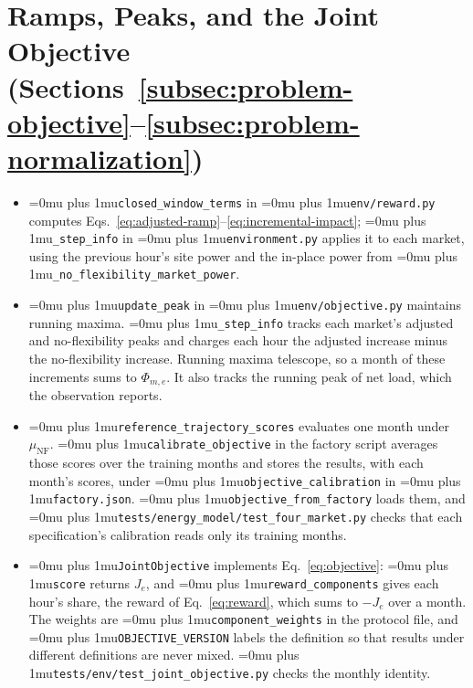 \documentclass{UNCC-thesis}
\newcommand{\codepath}[1]{{\Urlmuskip=0mu plus 1mu\relax\nolinkurl{#1}}}
\begin{document}
\section{Ramps, Peaks, and the Joint Objective
  (Sections~\ref{subsec:problem-objective}--\ref{subsec:problem-normalization})}
\begin{itemize}
  \item \codepath{closed_window_terms} in \codepath{env/reward.py}
        computes Eqs.~\eqref{eq:adjusted-ramp}--\eqref{eq:incremental-impact};
        \codepath{_step_info} in \codepath{environment.py} applies it to each
        market, using the previous hour's site power and the in-place power
        from \codepath{_no_flexibility_market_power}.
  \item \codepath{update_peak} in \codepath{env/objective.py}
        maintains running maxima. \codepath{_step_info} tracks each market's
        adjusted and no-flexibility peaks and charges each hour the adjusted
        increase minus the no-flexibility increase. Running maxima telescope, so
        a month of these increments sums to \(\Phi_{m,e}\). It also tracks the
        running peak of net load, which the observation reports.
  \item \codepath{reference_trajectory_scores} evaluates one month under
        \(\mu_{\mathrm{NF}}\). \codepath{calibrate_objective} in the factory
        script averages those scores over the training months and stores the
        results, with each month's scores, under
        \codepath{objective_calibration} in \codepath{factory.json}.
        \codepath{objective_from_factory} loads them, and
        \codepath{tests/energy_model/test_four_market.py} checks that
        each specification's calibration reads only its training months.
  \item \codepath{JointObjective} implements
        Eq.~\eqref{eq:objective}: \codepath{score} returns \(J_e\), and
        \codepath{reward_components} gives each hour's share, the reward of
        Eq.~\eqref{eq:reward}, which sums to \(-J_e\) over a month. The weights are \codepath{component_weights} in
        the protocol file, and \codepath{OBJECTIVE_VERSION} labels the
        definition so that results under different definitions are never
        mixed. \codepath{tests/env/test_joint_objective.py} checks the
        monthly identity.
\end{itemize}
\end{document}
